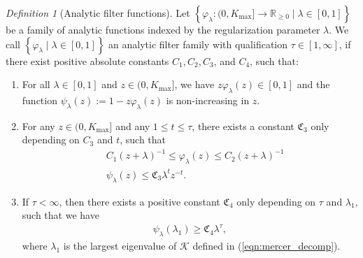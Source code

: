 \documentclass{article}
\theoremstyle{plain}
\theoremstyle{definition}
\theoremstyle{remark}
\newtheorem{definition}[theorem]{Definition}
\newcommand{\reg}{\varphi_\lambda}
\newcommand{\rem}{\psi_\lambda}
\newcommand{\R}{\mathbb{R}}
\begin{document}
\begin{definition}[Analytic filter functions]
  \label{def:filter}
  Let $\left\{ \reg : (0, K_{\max}] \to \R_{\geq 0} \mid \lambda \in [0, 1] \right\}$ be a family of analytic functions indexed by the regularization parameter $\lambda$.
  We call $\left\{ \reg \mid \lambda \in [0, 1]  \right\}$ an analytic filter family with qualification $\tau \in [1,\infty]$, if there exist positive absolute constants $C_1, C_2, C_3$, and $C_4$, such that:
  \begin{enumerate}
      \item 
      For all $\lambda\in[0,1]$ and $z\in(0,K_{\max}]$, we have $z \reg(z) \in [0, 1]$ and the function $\rem(z):= 1- z\reg(z)$ is non-increasing in $z$.
      
      \item 
        For any $z\in(0,K_{\max}]$ and any $1\leq t\leq \tau$,  there exists a constant $\mathfrak{C}_3$ only depending on $C_3$ and $t$, such that 
\begin{equation}\label{eq:Filter_case1}
    \begin{aligned}
        &~ C_1 (z+\lambda)^{-1} \leq \reg(z) \leq C_2 (z+\lambda)^{-1}\\
        &~ \rem(z) \leq \mathfrak{C}_3 \lambda^{t}z^{-t}.
    \end{aligned}
\end{equation}

        \item 
   
            If $\tau<\infty$, then there exists a positive constant $\mathfrak{C}_{4}$ only depending on $\tau$ and $\lambda_1$, such that we have
    \begin{align}
    \label{eq:Filter_Rem_finite_case2}
        \rem(\lambda_1) \geq \mathfrak{C}_{4} \lambda^{\tau},
    \end{align}
    where $\lambda_1$ is the largest eigenvalue of $\mathscr{K}$ defined in (\ref{eqn:mercer_decomp}).
        


\end{enumerate}
\end{definition}
\end{document}
